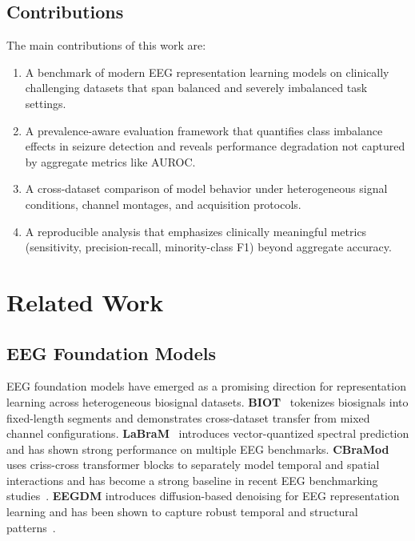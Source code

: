 \documentclass[journal]{IEEEtran}
\begin{document}
\subsection{Contributions}

The main contributions of this work are:
\begin{enumerate}
  \item A benchmark of modern EEG representation learning models on clinically challenging datasets that span balanced and severely imbalanced task settings.
  \item A prevalence-aware evaluation framework that quantifies class imbalance effects in seizure detection and reveals performance degradation not captured by aggregate metrics like AUROC.
  \item A cross-dataset comparison of model behavior under heterogeneous signal conditions, channel montages, and acquisition protocols.
  \item A reproducible analysis that emphasizes clinically meaningful metrics (sensitivity, precision-recall, minority-class F1) beyond aggregate accuracy.
\end{enumerate}

\section{Related Work}

\subsection{EEG Foundation Models}

EEG foundation models have emerged as a promising direction for representation learning across heterogeneous biosignal datasets. \textbf{BIOT}~\cite{yang2024biot} tokenizes biosignals into fixed-length segments and demonstrates cross-dataset transfer from mixed channel configurations. \textbf{LaBraM}~\cite{jiang2024labram} introduces vector-quantized spectral prediction and has shown strong performance on multiple EEG benchmarks. \textbf{CBraMod}~\cite{wang2024cbramod} uses criss-cross transformer blocks to separately model temporal and spatial interactions and has become a strong baseline in recent EEG benchmarking studies~\cite{wang2024cbramod}. \textbf{EEGDM} introduces diffusion-based denoising for EEG representation learning and has been shown to capture robust temporal and structural patterns~\cite{helwan2025diffeeg}.
\end{document}
